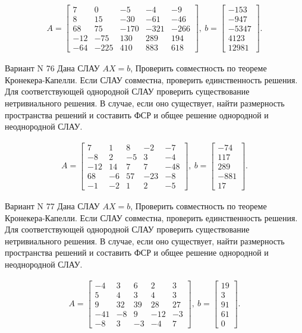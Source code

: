 \documentclass[11pt]{report}
\begin{document}
\begin{align*}
 A = \left[\begin{matrix}7 & 0 & -5 & -4 & -9\\8 & 15 & -30 & -61 & -46\\68 & 75 & -170 & -321 & -266\\-12 & -75 & 130 & 289 & 194\\-64 & -225 & 410 & 883 & 618\end{matrix}\right],
\ b = \left[\begin{matrix}-153\\-947\\-5347\\4123\\12981\end{matrix}\right]. 
 \end{align*}

Вариант N 76
Дана СЛАУ $AX = b$,
Проверить совместность по теореме Кронекера-Капелли. Если СЛАУ совместна, проверить единственность решения.
Для соответствующей однородной СЛАУ проверить существование нетривиального решения. В случае, если оно существует,
найти размерность пространства решений и составить ФСР и общее решение однородной  и неоднородной СЛАУ.


\begin{align*}
 A = \left[\begin{matrix}7 & 1 & 8 & -2 & -7\\-8 & 2 & -5 & 3 & -4\\-12 & 14 & 7 & 7 & -48\\68 & -6 & 57 & -23 & -8\\-1 & -2 & 1 & 2 & -5\end{matrix}\right],
\ b = \left[\begin{matrix}-74\\117\\289\\-881\\17\end{matrix}\right]. 
 \end{align*}

Вариант N 77
Дана СЛАУ $AX = b$,
Проверить совместность по теореме Кронекера-Капелли. Если СЛАУ совместна, проверить единственность решения.
Для соответствующей однородной СЛАУ проверить существование нетривиального решения. В случае, если оно существует,
найти размерность пространства решений и составить ФСР и общее решение однородной  и неоднородной СЛАУ.


\begin{align*}
 A = \left[\begin{matrix}-4 & 3 & 6 & 2 & 3\\5 & 4 & 3 & 4 & 3\\9 & 32 & 39 & 28 & 27\\-41 & -8 & 9 & -12 & -3\\-8 & 3 & -3 & -4 & 7\end{matrix}\right],
\ b = \left[\begin{matrix}19\\3\\91\\61\\0\end{matrix}\right]. 
 \end{align*}
\end{document}
